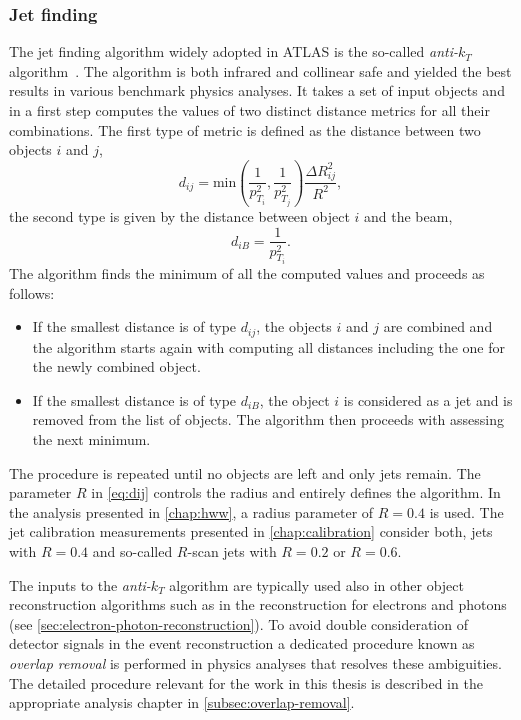 

\subsubsection{Jet finding}
The jet finding algorithm widely adopted in ATLAS is the so-called \emph{anti-$k_T$} algorithm~\cite{Cacciari:2008gp}. The algorithm is both infrared and collinear safe and yielded the best results in various benchmark physics analyses. 
It takes a set of input objects and in a first step computes the values of two distinct distance metrics for all their combinations.
The first type of metric is defined as the distance between two objects $i$ and $j$, 
\begin{equation}
    d_{ij} = \text{min}\left(\frac{1}{p_{T_i}^2},\frac{1}{p_{T_j}^2}\right) \frac{\Delta R_{ij}^2}{R^2},
    \label{eq:dij}
\end{equation}
the second type is given by the distance between object $i$ and the beam, 
    \begin{equation}
        d_{iB} = \frac{1}{p_{T_i}^2}.
\end{equation}
The algorithm finds the minimum of all the computed values and proceeds as follows:
\begin{itemize}
    \item If the smallest distance is of type $d_{ij}$, the objects $i$ and $j$ are combined and the algorithm starts again with computing all distances including the one for the newly combined object.
    \item If the smallest distance is of type $d_{iB}$, the object $i$ is considered as a jet and is removed from the list of objects. The algorithm then proceeds with assessing the next minimum.
\end{itemize}
The procedure is repeated until no objects are left and only jets remain. 
The parameter $R$ in \cref{eq:dij} controls the radius and entirely defines the algorithm. 
In the \HWW analysis presented in \cref{chap:hww}, a radius parameter of $R = 0.4$ is used. The jet calibration measurements presented in \cref{chap:calibration} consider both, jets with $R = 0.4$ and so-called $R$-scan jets with $R = 0.2$ or $R = 0.6$.

The inputs to the \emph{anti-$k_T$} algorithm are typically used also in other object reconstruction algorithms such as in the reconstruction for electrons and photons (see \cref{sec:electron-photon-reconstruction}). 
To avoid double consideration of detector signals in the event reconstruction a dedicated procedure known as \emph{overlap removal} is performed in physics analyses that resolves these ambiguities. The detailed procedure relevant for the work in this thesis is described in the appropriate analysis chapter in \cref{subsec:overlap-removal}.



